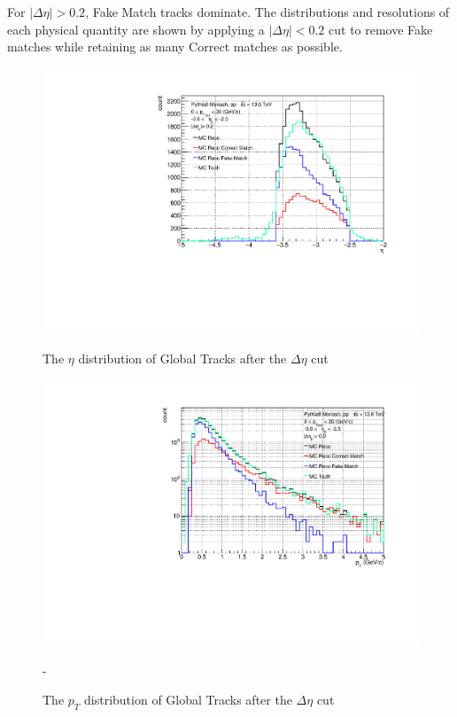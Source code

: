             For \( |\Delta \eta| > 0.2 \), Fake Match tracks dominate. The distributions and resolutions of each physical quantity are shown by applying a \( |\Delta \eta| < 0.2 \) cut to remove Fake matches while retaining as many Correct matches as possible.
            \begin{figure}[H]
                \centering
                \begin{minipage}{0.45\textwidth} %
                    \centering
                    \includegraphics[width=\textwidth]{fig/3_5_6_etacut02_eta.pdf} %
                    \caption{The $\eta$ distribution of Global Tracks after the $\Delta \eta$ cut}
                    \label{Analysis:Matching:afterCut_eta}
                \end{minipage}
                \hfill
                \begin{minipage}{0.45\textwidth}
                    \centering
                    \includegraphics[width=\textwidth]{fig/3_5_6_etacut02_pt.pdf} %
                    \caption{The $p_T$ distribution of Global Tracks after the $\Delta \eta$ cut}
                    \label{Analysis:Matching:afterCut_pt}
                \end{minipage}-
            \end{figure}
